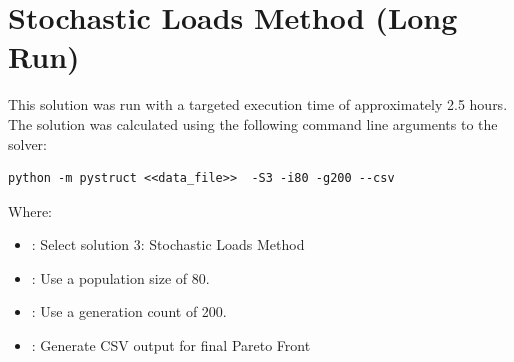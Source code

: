 \section{Stochastic Loads Method (Long Run)}
This solution was run with a targeted execution time of approximately 2.5 hours. The solution was calculated using the following command line arguments to the solver: 

\begin{verbatim}
python -m pystruct <<data_file>>  -S3 -i80 -g200 --csv
\end{verbatim}

\noindent Where: 

\begin{itemize}
  \item {}: Select solution 3: Stochastic Loads Method
  \item {}: Use a population size of 80. 
  \item {}: Use a generation count of 200. 
  \item {}: Generate CSV output for final Pareto Front
\end{itemize}


